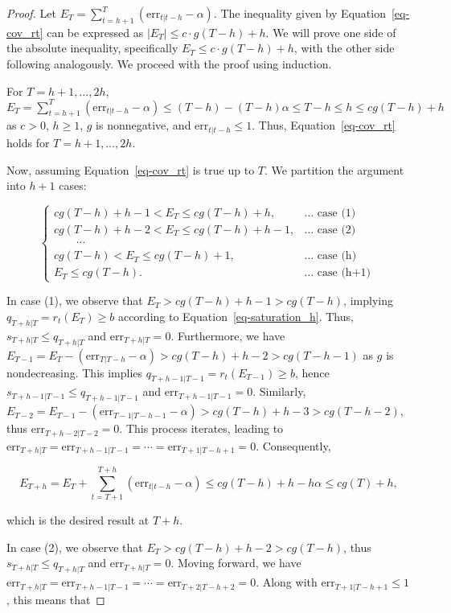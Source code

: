 \documentclass[
  11pt,
  a4paper,
]{article}
\theoremstyle{plain}
\theoremstyle{remark}
\begin{document}
\begin{proof}
Let \(E_T=\sum_{t=h+1}^{T}\left(\mathrm{err}_{t|t-h}-\alpha\right)\).
The inequality given by Equation~\ref{eq-cov_rt} can be expressed as
\(\left|E_T\right| \leq c \cdot g(T-h) + h\). We will prove one side of
the absolute inequality, specifically \(E_T \leq c \cdot g(T-h) + h\),
with the other side following analogously. We proceed with the proof
using induction.

For \(T=h+1,\ldots,2h\),
\(E_T = \sum_{t=h+1}^{T}(\mathrm{err}_{t|t-h}-\alpha) \leq (T-h)-(T-h)\alpha \leq T-h \leq h \leq cg(T-h) + h\)
as \(c>0\), \(h\geq 1\), \(g\) is nonnegative, and
\(\mathrm{err}_{t|t-h} \leq 1\). Thus, Equation~\ref{eq-cov_rt} holds
for \(T=h+1,\ldots,2h\).

Now, assuming Equation~\ref{eq-cov_rt} is true up to \(T\). We partition
the argument into \(h+1\) cases:

\[
\begin{cases}
cg(T-h)+h-1 < E_T \leq cg(T-h)+h, & \ldots \text { case (1) } \\
cg(T-h)+h-2 < E_T \leq cg(T-h)+h-1, & \ldots \text { case (2) } \\
\qquad \cdots \\
cg(T-h) < E_T \leq cg(T-h)+1, & \ldots \text { case (h) } \\
E_T \leq cg(T-h). & \ldots \text { case (h+1) }
\end{cases}
\]

In case (1), we observe that \(E_T > cg(T-h)+h-1 > cg(T-h)\), implying
\(q_{T+h|T} = r_t(E_{T}) \geq b\) according to
Equation~\ref{eq-saturation_h}. Thus, \(s_{T+h|T} \leq q_{T+h|T}\) and
\(\mathrm{err}_{T+h|T} = 0\). Furthermore, we have
\(E_{T-1} = E_T - (\mathrm{err}_{T|T-h} - \alpha) > cg(T-h)+h-2 > cg(T-h-1)\)
as \(g\) is nondecreasing. This implies
\(q_{T+h-1|T-1} = r_t(E_{T-1}) \geq b\), hence
\(s_{T+h-1|T-1} \leq q_{T+h-1|T-1}\) and
\(\mathrm{err}_{T+h-1|T-1} = 0\). Similarly,
\(E_{T-2} = E_{T-1} - (\mathrm{err}_{T-1|T-h-1} - \alpha) > cg(T-h)+h-3 > cg(T-h-2)\),
thus \(\mathrm{err}_{T+h-2|T-2} = 0\). This process iterates, leading to
\(\mathrm{err}_{T+h|T} = \mathrm{err}_{T+h-1|T-1} = \cdots = \mathrm{err}_{T+1|T-h+1} = 0\).
Consequently,

\[
E_{T+h} = E_T+\sum_{t=T+1}^{T+h}(\mathrm{err}_{t|t-h}-\alpha) \leq cg(T-h)+h-h\alpha \leq cg(T)+h,
\]

which is the desired result at \(T+h\).

In case (2), we observe that \(E_T > cg(T-h)+h-2 > cg(T-h)\), thus
\(s_{T+h|T} \leq q_{T+h|T}\) and \(\mathrm{err}_{T+h|T} = 0\). Moving
forward, we have
\(\mathrm{err}_{T+h|T} = \mathrm{err}_{T+h-1|T-1} = \cdots = \mathrm{err}_{T+2|T-h+2} = 0\).
Along with \(\mathrm{err}_{T+1|T-h+1} \leq 1\), this means that


\end{proof}
\end{document}

